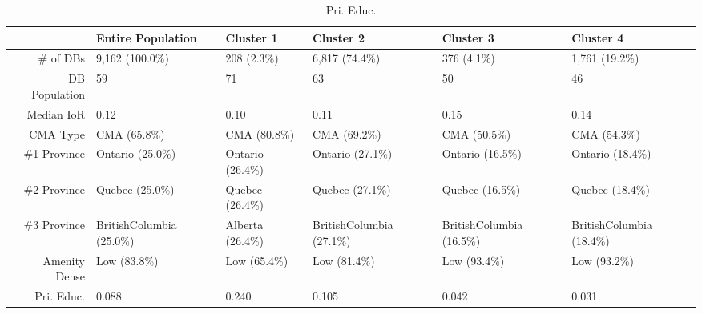 \documentclass[11pt, a4paper]{article}
\begin{document}
\begin{sidewaystable}[ht]
\centering
\begin{tabular}{rlllll}
  \hline
 & Entire Population & Cluster 1 & Cluster 2 & Cluster 3 & Cluster 4 \\ 
  \hline
\# of DBs & 9,162 (100.0\%) & 208 (2.3\%) & 6,817 (74.4\%) & 376 (4.1\%) & 1,761 (19.2\%) \\ 
  DB Population & 59 & 71 & 63 & 50 & 46 \\ 
  Median IoR & 0.12 & 0.10 & 0.11 & 0.15 & 0.14 \\ 
  CMA Type & CMA (65.8\%) & CMA (80.8\%) & CMA (69.2\%) & CMA (50.5\%) & CMA (54.3\%) \\ 
  \#1 Province & Ontario (25.0\%) & Ontario (26.4\%) & Ontario (27.1\%) & Ontario (16.5\%) & Ontario (18.4\%) \\ 
  \#2 Province & Quebec (25.0\%) & Quebec (26.4\%) & Quebec (27.1\%) & Quebec (16.5\%) & Quebec (18.4\%) \\ 
  \#3 Province & BritishColumbia (25.0\%) & Alberta (26.4\%) & BritishColumbia (27.1\%) & BritishColumbia (16.5\%) & BritishColumbia (18.4\%) \\ 
  Amenity Dense & Low (83.8\%) & Low (65.4\%) & Low (81.4\%) & Low (93.4\%) & Low (93.2\%) \\ 
  Pri. Educ. & 0.088 & 0.240 & 0.105 & 0.042 & 0.031 \\ 
   \hline
\end{tabular}
\caption{Pri. Educ.} 
\end{sidewaystable}





 \pagebreak 
 
\end{document}
